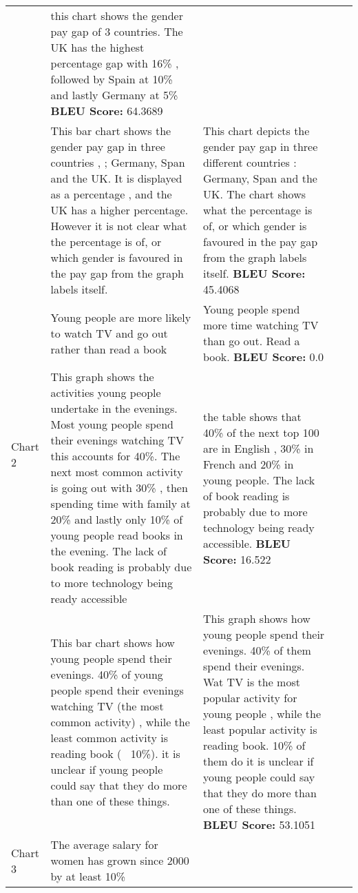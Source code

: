 \documentclass[]{article}
\begin{document}
\begin{landscape}
\begin{longtable}{|p{13mm}|p{57mm}|p{57mm}|p{57mm}|p{57mm}|}
 & this chart shows the gender pay gap of 3 countries. The UK has the highest percentage gap with 16\% , followed by Spain at 10\% and lastly Germany at 5\%
\newline \textbf{BLEU Score: }64.3689\\ \cline{2-5}&This bar chart shows the gender pay gap in three countries , ; Germany, Span and the UK. It is displayed as a percentage , and the UK has a higher percentage. However it is not clear what the percentage is of, or which gender is favoured in the pay gap from the graph labels itself. 
 & This chart depicts the gender pay gap in three different countries : Germany, Span and the UK. The chart shows what the percentage is of, or which gender is favoured in the pay gap from the graph labels itself.
\newline \textbf{BLEU Score: }45.4068\\ \cline{2-5}\hline\multirow{2}{*}{Chart 2}&Young people are more likely to watch TV and go out rather than read a book 
 & Young people spend more time watching TV than go out. Read a book.
\newline \textbf{BLEU Score: }0.0\\ \cline{2-5}&This graph shows the activities young people undertake in the evenings. Most young people spend their evenings watching TV this accounts for 40\%. The next most common activity is going out with 30\% , then spending time with family at 20\% and lastly only 10\% of young people read books in the evening. The lack of book reading is probably due to more technology being ready accessible 
 & the table shows that 40\% of the next top 100 are in English , 30\% in French and 20\% in young people. The lack of book reading is probably due to more technology being ready accessible.
\newline \textbf{BLEU Score: }16.522\\ \cline{2-5}&This bar chart shows how young people spend their evenings. 40\% of young people spend their evenings watching TV (the most common activity) , while the least common activity is reading book (~ 10\%). it is unclear if young people could say that they do more than one of these things. 
 & This graph shows how young people spend their evenings. 40\% of them spend their evenings. Wat TV is the most popular activity for young people , while the least popular activity is reading book. 10\% of them do it is unclear if young people could say that they do more than one of these things.
\newline \textbf{BLEU Score: }53.1051\\ \cline{2-5}\hline\multirow{2}{*}{Chart 3}&The average salary for women has grown since 2000 by at least 10\% 

\end{longtable}
\end{landscape}
\end{document}
